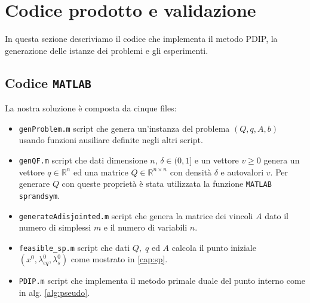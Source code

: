 \section{Codice prodotto e validazione}
In questa sezione descriviamo il codice che implementa il metodo PDIP, la generazione delle istanze dei problemi e gli esperimenti.

\subsection{Codice \texttt{MATLAB}}
La nostra soluzione è composta da cinque files:

\begin{itemize}
    \item \texttt{genProblem.m} script che genera un'instanza del problema $(Q,q,A,b)$ usando funzioni ausiliare definite negli altri script.
    \item \texttt{genQF.m} script che dati dimensione $n$, $\delta \in (0,1]$ e un vettore $v\geq0$ genera un vettore $q\in\mathbb{R}^n$ ed una matrice $Q \in \mathbb{R}^{n \times n}$ con densità $\delta$ e autovalori $v$.
    Per generare $Q$ con queste proprietà è stata utilizzata la funzione \texttt{MATLAB} \texttt{sprandsym}.
    
   \item \texttt{generateAdisjointed.m} script che genera la matrice dei vincoli $A$ dato il numero di simplessi $m$ e il numero di variabili $n$.
    \item \texttt{feasible\_sp.m} script che dati $Q, \;q$ ed $A$ calcola il punto iniziale $(x^0, \lambda_{eq}^0, \lambda_s^0)$ come mostrato in \ref{cap:sp}.
    
    \item \texttt{PDIP.m} script che implementa il metodo primale duale del punto interno come in alg. \ref{alg:pseudo}.
    
\end{itemize}


